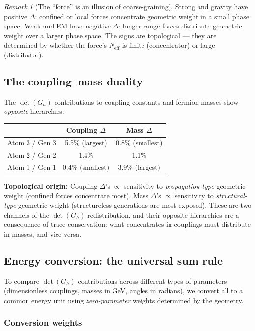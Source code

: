 \documentclass[12pt]{article}
\theoremstyle{remark}
\newtheorem{remark}[theorem]{Remark}
\theoremstyle{definition}
\begin{document}
\begin{remark}[The ``force'' is an illusion of coarse-graining]
Strong and gravity have positive $\Delta$: confined or local forces concentrate geometric weight in a small phase space. Weak and EM have negative $\Delta$: longer-range forces distribute geometric weight over a larger phase space. The signs are topological --- they are determined by whether the force's $N_\text{eff}$ is finite (concentrator) or large (distributor).

\subsection{The coupling--mass duality}

The $\det(G_h)$ contributions to coupling constants and fermion masses show \emph{opposite} hierarchies:

\begin{center}
\begin{tabular}{lcc}
\hline
& Coupling $\Delta$ & Mass $\Delta$ \\
\hline
Atom 3 / Gen 3 & 5.5\% (largest) & 0.8\% (smallest) \\
Atom 2 / Gen 2 & 1.4\% & 1.1\% \\
Atom 1 / Gen 1 & 0.4\% (smallest) & 3.9\% (largest) \\
\hline
\end{tabular}
\end{center}

\textbf{Topological origin:} Coupling $\Delta$'s $\propto$ sensitivity to \emph{propagation-type} geometric weight (confined forces concentrate most). Mass $\Delta$'s $\propto$ sensitivity to \emph{structural-type} geometric weight (structureless generations are most exposed). These are two channels of the $\det(G_h)$ redistribution, and their opposite hierarchies are a consequence of trace conservation: what concentrates in couplings must distribute in masses, and vice versa.

\subsection{Energy conversion: the universal sum rule}

To compare $\det(G_h)$ contributions across different types of parameters (dimensionless couplings, masses in GeV, angles in radians), we convert all to a common energy unit using \emph{zero-parameter} weights determined by the geometry.

\subsubsection{Conversion weights}


\end{remark}
\end{document}
